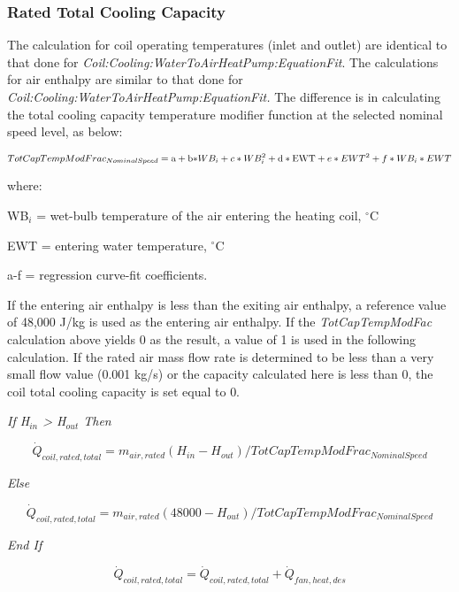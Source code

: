 \subsubsection{Rated Total Cooling Capacity}\label{rated-total-cooling-capacity-1}

The calculation for coil operating temperatures (inlet and outlet) are identical to that done for \emph{Coil:Cooling:WaterToAirHeatPump:EquationFit}. The calculations for air enthalpy are similar to that done for \emph{Coil:Cooling:WaterToAirHeatPump:EquationFit.} The difference is in calculating the total cooling capacity temperature modifier function at the selected nominal speed level, as below:

\begin{equation}
TotCapTempModFra{c_{NominalSpeed}} = {\rm{a}} + {\rm{b*}}W{B_i} + c*WB_i^2 + {\rm{d*EWT}} + e*EW{T^2} + f*W{B_i}*EWT
\end{equation}

where:

WB\(_{i}\) = wet-bulb temperature of the air entering the heating coil, \(^{\circ}\)C

EWT = entering water temperature, \(^{\circ}\)C

a-f = regression curve-fit coefficients.

If the entering air enthalpy is less than the exiting air enthalpy, a reference value of 48,000 J/kg is used as the entering air enthalpy. If the \emph{TotCapTempModFac} calculation above yields 0 as the result, a value of 1 is used in the following calculation. If the rated air mass flow rate is determined to be less than a very small flow value (0.001 kg/s) or the capacity calculated here is less than 0, the coil total cooling capacity is set equal to 0.

\emph{If H\(_{in}\) \textgreater{} H\(_{out}\) Then}

\begin{equation}
{\dot Q_{coil,rated,total}} = {m_{air,rated}}({H_{in}} - {H_{out}})/TotCapTempModFra{c_{NominalSpeed}}
\end{equation}

\emph{Else}

\begin{equation}
{\dot Q_{coil,rated,total}} = {m_{air,rated}}(48000 - {H_{out}})/TotCapTempModFra{c_{NominalSpeed}}
\end{equation}

\emph{End If}

\begin{equation}
{\dot Q_{coil,rated,total}} = {\dot Q_{coil,rated,total}} + \dot{Q}_{fan,heat,des}
\end{equation}

